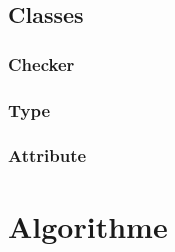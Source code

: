     \subsection{Classes}

        \subsubsection{Checker}

        \subsubsection{Type}

        \subsubsection{Attribute}

\section{Algorithme}

